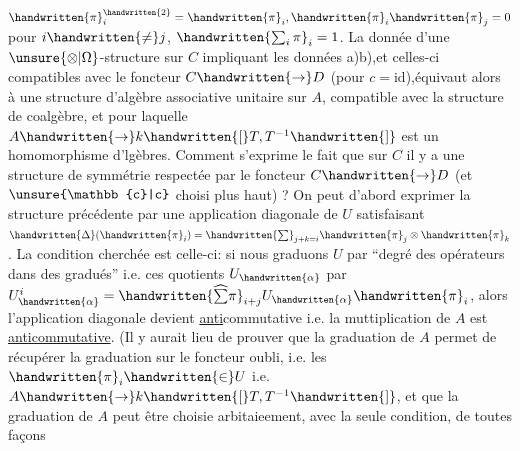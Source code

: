 
$\handwritten{\pi}_i^{\handwritten{2}}=\handwritten{\pi}_i,\handwritten{\pi}_i\handwritten{\pi}_j=0$ pour $i\handwritten{\ne}j$, $\handwritten{\sum_i\pi}_i=1$. La donnée d'une $\unsure{\otimes|\Omega}$-structure sur $C$ impliquant les données a)b),et celles-ci compatibles avec le foncteur $C\handwritten{\to}D$ (pour $c=\mathrm{id}$),équivaut alors à une structure d'algèbre associative unitaire sur $A$, compatible avec la structure de coalgèbre, et pour laquelle $A\handwritten{\to}k\handwritten{[}T,T^{-1}\handwritten{]}$ est un homomorphisme d'lgèbres. Comment s'exprime le fait que  sur $C$ il y a une structure de symmétrie  respectée par le foncteur $C\handwritten{\to}D$ (et $\unsure{\mathbb{c}|c}$ choisi plus haut) ? On peut d'abord exprimer la structure précédente par une application diagonale de $U$ satisfaisant $\handwritten{\Delta}(\handwritten{\pi}_i)=\handwritten{\sum}_{j+k=i}\handwritten{\pi}_j\otimes\handwritten{\pi}_k$. La condition cherchée  est celle-ci: si nous graduons $U$ par ``degré des opérateurs dans des gradués'' i.e.  ces quotients $U_{\handwritten{\alpha}}$ par $U_{\handwritten{\alpha}}^i=\handwritten{\widehat{\sum}\pi}_{i+j}U_{\handwritten{\alpha}}\handwritten{\pi}_i$, alors l'application diagonale devient \uline{anti}commutative i.e. la muttiplication de $A$  est \uline{anticommutative}. (Il y aurait lieu de prouver que la graduation de $A$ permet de récupérer la  graduation sur le foncteur oubli, i.e. les $\handwritten{\pi}_i\handwritten{\in}U$ i.e. $A\handwritten{\to}k\handwritten{[}T,T^{-1}\handwritten{]}$, et que la graduation de $A$  peut être choisie arbitaieement, avec la seule condition, de toutes façons 